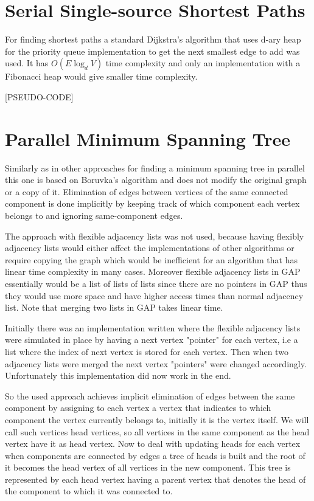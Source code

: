 \documentclass{report}
\theoremstyle{plain}
\theoremstyle{definition}
\theoremstyle{remark}
\begin{document}
\section{Serial Single-source Shortest Paths}

For finding shortest paths a standard Dijkstra's algorithm that uses d-ary heap for the priority queue implementation to get the next smallest edge to add was used. It has $O(E\log_dV)$ time complexity and only an implementation with a Fibonacci heap would give smaller time complexity.

[PSEUDO-CODE]

\section{Parallel Minimum Spanning Tree}

Similarly as in other approaches \cite{Bader20061366} for finding a minimum spanning tree in parallel this one is based on Boruvka's algorithm and does not modify the original graph or a copy of it. Elimination of edges between vertices of the same connected component is done implicitly by keeping track of which component each vertex belongs to and ignoring same-component edges.

The approach with flexible adjacency lists \cite{Bader20061366} was not used, because having flexibly adjacency lists would either affect the implementations of other algorithms or require copying the graph which would be inefficient for an algorithm that has linear time complexity in many cases. Moreover flexible adjacency lists in GAP essentially would be a list of lists of lists since there are no pointers in GAP thus they would use more space and have higher access times than normal adjacency list. Note that merging two lists in GAP takes linear time.

Initially there was an implementation written where the flexible adjacency lists were simulated in place by having a next vertex "pointer" for each vertex, i.e a list where the index of next vertex is stored for each vertex. Then when two adjacency lists were merged the next vertex "pointers" were changed accordingly. Unfortunately this implementation did now work in the end.

So the used approach achieves implicit elimination of edges between the same component by assigning to each vertex a vertex that indicates to which component the vertex currently belongs to, initially it is the vertex itself. We will call such vertices head vertices, so all vertices in the same component as the head vertex have it as head vertex. Now to deal with updating heads for each vertex when components are connected by edges a tree of heads is built and the root of it becomes the head vertex of all vertices in the new component. This tree is represented by each head vertex having a parent vertex that denotes the head of the component to which it was connected to.
\end{document}
